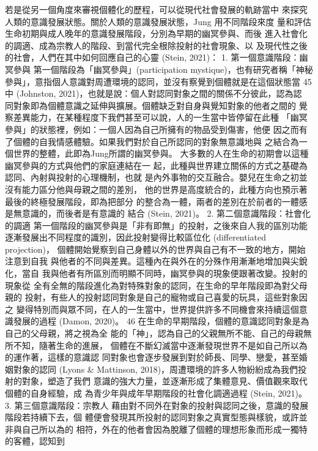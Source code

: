 若是從另一個角度來審視個體化的歷程，可以從現代社會發展的軌跡當中
來探究人類的意識發展狀態。關於人類的意識發展狀態，Jung 用不同階段來度
量和評估生命初期與成人晚年的意識發展階段，分別為早期的幽冥參與、而後
進入社會化的調適、成為宗教人的階段、到當代完全根除投射的社會現象、以
及現代性之後的社會，人們在其中如何回應自己的心靈 (Stein, 2021)： 
1. 第一個意識階段：幽冥參與 
第一個階段為「幽冥參與」(participation mystique)，也有研究者稱「神秘
參與」，意指個人意識對周遭環境的認同，並沒有察覺到個體就是在這個狀態當
45 
中 (Johnston, 2021)，也就是說：個人對認同對象之間的關係不分彼此，認為認
同對象即為個體意識之延伸與擴展。個體缺乏對自身與覺知對象的他者之間的
覺察差異能力，在某種程度下我們甚至可以說，人的一生當中皆停留在此種
「幽冥參與」的狀態裡，例如：一個人因為自己所擁有的物品受到傷害，他便
因之而有了個體的自我情感體驗。如果我們對於自己所認同的對象無意識地與
之結合為一個世界的整體，此即為Jung所謂的幽冥參與。 
大多數的人在生命的初期會以這種幽冥參與的方式與他們的家庭連結在一
起，此種與世界建立關係的方式之基礎為認同、內射與投射的心理機制，也就
是內外事物的交互融合。嬰兒在生命之初並沒有能力區分他與母親之間的差別，
他的世界是高度統合的，此種方向也預示著最後的終極發展階段，即為把部分
的整合為一體，兩者的差別在於前者的一體感是無意識的，而後者是有意識的
結合 (Stein, 2021)。 
2. 第二個意識階段：社會化的調適 
第一個階段的幽冥參與是「非有即無」的投射，之後來自人我的區別功能
逐漸發展出不同程度的識別，因此投射變得比較區位化 (differentiated projection)，
個體開始覺察到自己身體以外的世界與自己有不一致的地方，開始注意到自我
與他者的不同與差異。這種內在與外在的分殊作用漸漸地增加與尖銳化，當自
我與他者有所區別而明顯不同時，幽冥參與的現象便跟著改變。投射的現象從
全有全無的階段進化為對特殊對象的認同，在生命的早年階段即為對父母親的
投射，有些人的投射認同對象是自己的寵物或自己喜愛的玩具，這些對象因之
變得特別而與眾不同，在人的一生當中，世界提供許多不同機會來持續這個意
識發展的過程 (Damon, 2020)。 
46 
在生命的早期階段，個體的意識認同對象是為自己的父母親，將之視為全
能的「神」，認為自己的父親無所不能、自己的母親無所不知，隨著生命的進展，
個體在不斷幻滅當中逐漸發現世界不是如自己所以為的運作著，這樣的意識認
同對象也會逐步發展到對於師長、同學、戀愛，甚至婚姻對象的認同 (Lyons & 
Mattinson, 2018)，周遭環境的許多人物紛紛成為我們投射的對象，塑造了我們
意識的強大力量，並逐漸形成了集體意見、價值觀來取代個體的自身經驗，成
為青少年與成年早期階段的社會化調適過程 (Stein, 2021)。 
3. 第三個意識階段：宗教人 
藉由對不同外在對象的投射與認同之後，意識的發展階段若持續下去，個
體便會發現其所投射的認同對象之真實型態與樣貌，或許並非與自己所以為的
相符，外在的他者會因為脫離了個體的理想形象而形成一獨特的客體，認知到

